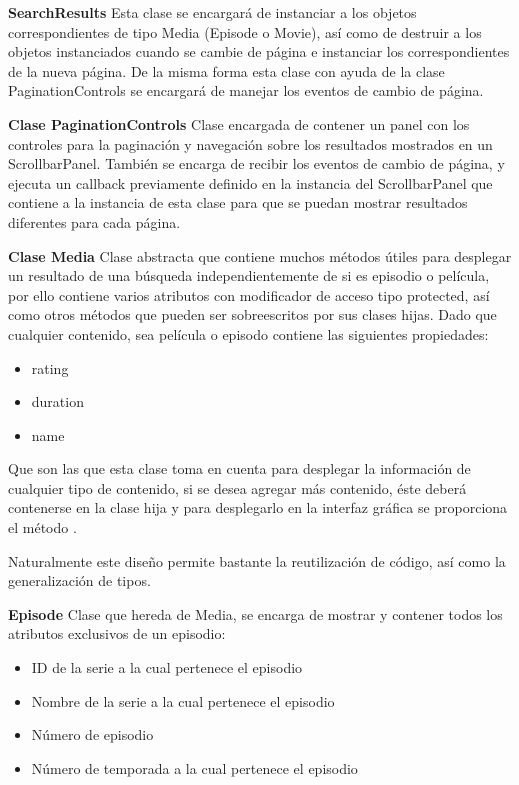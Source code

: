 \textbf{SearchResults}\newline
Esta clase se encargará de instanciar a los objetos correspondientes de tipo Media (Episode o Movie), así como de destruir a los objetos instanciados cuando se cambie de página e instanciar los correspondientes de la nueva página. De la misma forma esta clase con ayuda de la clase PaginationControls se encargará de manejar los eventos de cambio de página.

\textbf{Clase PaginationControls}\newline
Clase encargada de contener un panel con los controles para la paginación y navegación sobre los resultados mostrados en un ScrollbarPanel. También se encarga de recibir los eventos de cambio de página, y ejecuta un callback previamente definido en la instancia del ScrollbarPanel que contiene a la instancia de esta clase para que se puedan mostrar resultados diferentes para cada página.

\textbf{Clase Media}\newline
Clase abstracta que contiene muchos métodos útiles para desplegar un resultado de una búsqueda independientemente de si es episodio o película, por ello contiene varios atributos con modificador de acceso tipo protected, así como otros métodos que pueden ser sobreescritos por sus clases hijas.
Dado que cualquier contenido, sea película o episodo contiene las siguientes propiedades:

\begin{itemize}
	\item rating
	\item duration
	\item name
\end{itemize}

Que son las que esta clase toma en cuenta para desplegar la información de cualquier tipo de contenido, si se desea agregar más contenido, éste deberá contenerse en la clase hija y para desplegarlo en la interfaz gráfica se proporciona el método .

Naturalmente este diseño permite bastante la reutilización de código, así como la generalización de tipos.

\textbf{Episode}\newline
Clase que hereda de Media, se encarga de mostrar y contener todos los atributos exclusivos de un episodio:

\begin{itemize}
	\item ID de la serie a la cual pertenece el episodio
	\item Nombre de la serie a la cual pertenece el episodio
	\item Número de episodio
	\item Número de temporada a la cual pertenece el episodio
\end{itemize}

